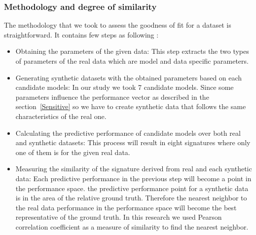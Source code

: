 \subsubsection{Methodology and degree of similarity}
The methodology that we took to assess the goodness of fit for a dataset is straightforward. It contains few steps as following :
\begin{itemize}
\item Obtaining the parameters of the given data: This step extracts the two types of parameters of the real data which are model and data specific parameters. 
\item Generating synthetic datasets with the obtained parameters based on each candidate models: In our study we took 7 candidate models. Since some parameters influence the performance vector as described in the section~\ref{Sensitive} so we have to create synthetic data that follows the same characteristics of the real one.

\item Calculating the predictive performance of candidate models over both real and synthetic datasets: This process will result in eight signatures where only one of them is for the given real data.
\item Measuring the similarity of the signature derived from real and each synthetic data: Each predictive performance in the previous step will become a point in the performance space. the predictive performance point for a synthetic data is in the area of the relative ground truth. Therefore the nearest neighbor to the real data performance in the performance space will become the best representative of the ground truth. In this research we used Pearson correlation coefficient as a measure of similarity to find the nearest neighbor.
\end{itemize}



